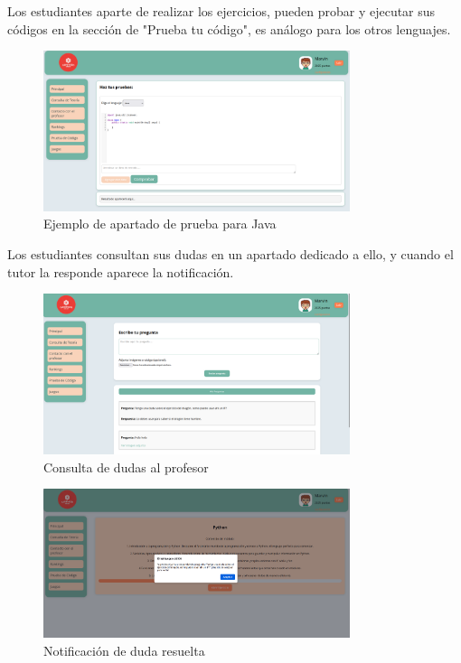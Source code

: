 \begin{appendices}
Los estudiantes aparte de realizar los ejercicios, pueden probar y ejecutar sus códigos en la sección de "Prueba tu código", es análogo para los otros lenguajes.

\begin{figure}[H]
    \centering
    \includegraphics[width=0.8\textwidth]{imagenes/Manual/prueba1.png}
    \caption{Ejemplo de apartado de prueba para Java}
\end{figure}

Los estudiantes consultan sus dudas en un apartado dedicado a ello, y cuando el tutor la responde aparece la notificación. 

\begin{figure}[H]
    \centering
    \includegraphics[width=0.8\textwidth]{imagenes/Manual/contacto.png}
    \caption{Consulta de dudas al profesor}
\end{figure}

\begin{figure}[H]
    \centering
    \includegraphics[width=0.8\textwidth]{imagenes/Manual/notificacion.png}
    \caption{Notificación de duda resuelta}
\end{figure}


\end{appendices}
